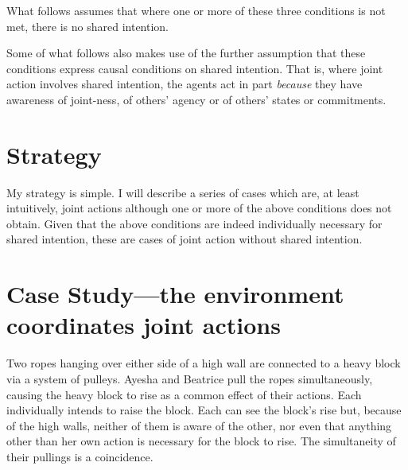 \documentclass[12pt,a4paper]{extarticle}
\begin{document}
What follows assumes that where one or more of these three conditions is not met, there is no shared intention. 

Some of what follows also makes use of the further assumption that these conditions express causal conditions on shared intention.  That is, where joint action involves shared intention, the agents act in part \emph{because} they have awareness of joint-ness, of others' agency or of others' states or commitments.




\section{Strategy}
My strategy is simple.  I will describe a series of cases which are, at least intuitively, joint actions although one or more of the above conditions does not obtain.  Given that the above conditions are indeed individually necessary for shared intention, these are cases of joint action without shared intention.





\section{Case Study---the environment coordinates joint actions}

Two ropes hanging over either side of a high wall are connected to a heavy block via a system of pulleys.  Ayesha and Beatrice pull the ropes simultaneously, causing the heavy block to rise as a common effect of their actions.  Each individually intends to raise the block.  Each can see the block's rise but, because of the high walls, neither of them is aware of the other, nor even that anything other than her own action is necessary for the block to rise.  The simultaneity of their pullings is a coincidence.
\end{document}

